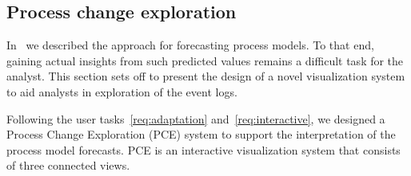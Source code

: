 \subsection{Process change exploration}\label{sec:3c:pce}




In~ we described the approach for forecasting process models. To that end, gaining actual insights from such predicted values remains a difficult task for the analyst. This section sets off to present the design of a novel visualization system to aid analysts in exploration of the event logs.

Following the user tasks~\ref{req:adaptation} and~\ref{req:interactive}, we designed a Process Change Exploration (PCE) system to support the interpretation of the process model forecasts. PCE is an interactive visualization system that consists of three connected views.




%
%




